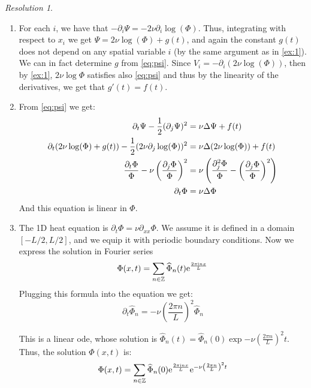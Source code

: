 \documentclass[10pt,a4paper]{article}
\theoremstyle{remark}
\newtheorem*{res}{Resolution}
\begin{document}
\begin{res}\hfill
  \begin{enumerate}
    \item For each $i$, we have that $-\partial_i \Psi = -2\nu \partial_i\log(\Phi)$. Thus, integrating with respect to $x_i$ we get $\Psi = 2\nu \log(\Phi) + g(t)$, and again the constant $g(t)$ does not depend on any spatial variable $i$ (by the same argument as in \cref{ex:1}). We can in fact determine $g$ from \cref{eq:psi}. Since $V_i=-\partial_i(2\nu \log(\Phi))$, then by \cref{ex:1}, $2\nu \log \Phi$ satisfies also \cref{eq:psi} and thus by the linearity of the derivatives, we get that $g'(t) = f(t)$.
    \item From \cref{eq:psi} we get:
          \begin{align*}
            \partial_t \Psi - \frac{1}{2}(\partial_j \Psi)^2                               & = \nu \Delta  \Psi + f(t)                                                                   \\
            \partial_t (2\nu\log(\Phi) + g(t)) - \frac{1}{2}(2\nu \partial_j \log(\Phi))^2 & = \nu \Delta  (2\nu \log(\Phi)) + f(t)                                                      \\
            \frac{\partial_t\Phi}{\Phi} -\nu \left(\frac{\partial_j\Phi}{\Phi}\right)^2    & = \nu \left(\frac{\partial_j^2\Phi}{\Phi} - {\left(\frac{\partial_j\Phi}{\Phi}\right)}^2\right) \\
            \partial_t\Phi                                                                 & = \nu \Delta \Phi
          \end{align*}
          And this equation is linear in $\Phi$.
    \item The 1D heat equation is $\partial_t \Phi = \nu \partial_{xx} \Phi$. We assume it is defined in a domain $[-L/2,L/2]$, and we equip it with periodic boundary conditions. Now we express the solution in Fourier series $$\Phi(x,t) = \sum_{n\in\mathbb{Z}} \widehat{\Phi}_n(t) \mathrm{e}^{\frac{2\pi\mathrm{i} nx}{L}}$$
          Plugging this formula into the equation we get:
          \begin{equation*}
            \partial_t \widehat{\Phi}_n= -\nu \left(\frac{2\pi n}{L}\right)^2 \widehat{\Phi}_n
          \end{equation*}

          This is a linear ode, whose solution is $\widehat{\Phi}_n(t) = \widehat{\Phi}_n(0) \exp{-\nu \left(\frac{2\pi n}{L}\right)^2 t}$. Thus, the solution $\Phi(x,t)$ is:
          \begin{equation*}
            \Phi(x,t) = \sum_{n\in\mathbb{Z}} \widehat{\Phi}_n(0) \mathrm{e}^{\frac{2\pi\mathrm{i} nx}{L}} \mathrm{e}^{-\nu \left(\frac{2\pi n}{L}\right)^2 t}
          \end{equation*}
  \end{enumerate}
\end{res}
\end{document}
